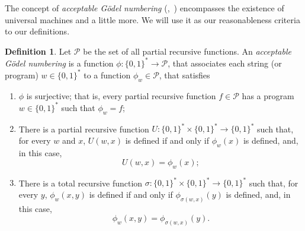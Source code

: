 \documentclass[12pt]{article}
\theoremstyle{definition}
\newtheorem{definition}{Definition}
\begin{document}
The concept of \emph{acceptable Gödel numbering}
(\cite[p.~41]{Rogers1987},~\cite[p.~324]{Blum1967})
encompasses the existence of universal machines and a little more.
We will use it as our reasonableness criteria to our definitions.

\vspace{6pt}
\begin{definition}
    Let $\mathcal P$ be the set of all partial recursive functions.
    An \emph{acceptable Gödel numbering}
    is a function $\phi : \{0, 1\}^* \to \mathcal P$,
    that associates each string (or program\footnotemark) $w \in \{0, 1\}^*$
    to a function $\phi_w \in \mathcal P$,
    that satisfies
    \begin{enumerate}
        \item $\phi$ is surjective;
            that is, every partial recursive function $f \in \mathcal P$
            has a program $w \in \{0, 1\}^*$ such that $\phi_w = f$;
            \label{surjectiveness}
        \item There is a partial recursive function
            $U:\{0, 1\}^* \times \{0, 1\}^* \to \{0, 1\}^*$ such that,
            for every $w$ and $x$,
            $U(w, x)$ is defined if and only if $\phi_w(x)$ is defined,
            and, in this case,
            \begin{equation*}
                U(w, x) = \phi_w(x);
            \end{equation*}
            \label{universal-tm}
            \vspace{-18pt}
        \item There is a total recursive function
            $\sigma:\{0, 1\}^* \times \{0, 1\}^* \to \{0, 1\}^*$ such that,
            for every $y$,
            $\phi_w(x, y)$ is defined if and only if $\phi_{\sigma(w, x)}(y)$ is defined,
            and, in this case,
            \begin{equation*}
                \phi_w(x, y) = \phi_{\sigma(w, x)}(y).
            \end{equation*}
            \label{smn-theorem}
            \vspace{-18pt}
    \end{enumerate}
\end{definition}
\end{document}
